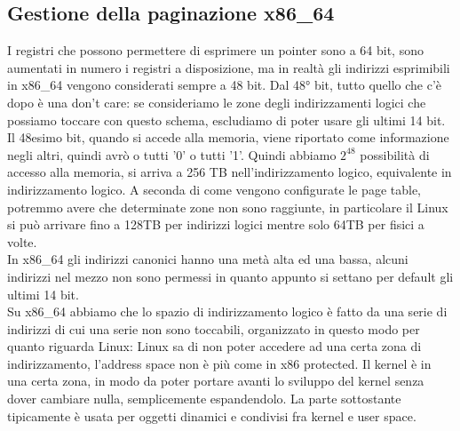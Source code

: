 \documentclass[12pt, oneside]{extbook}
\begin{document}
\subsection{Gestione della paginazione x86\_64}
I registri che possono permettere di esprimere un pointer sono a 64 bit, sono aumentati in numero i registri a disposizione, ma in realtà gli indirizzi esprimibili in x86\_64 vengono considerati sempre a 48 bit. Dal 48° bit, tutto quello che c'è dopo è una don't care: se consideriamo le zone degli indirizzamenti logici che possiamo toccare con questo schema, escludiamo di poter usare gli ultimi 14 bit. Il 48esimo bit, quando si accede alla memoria, viene riportato come informazione negli altri, quindi avrò o tutti '0' o tutti '1'. Quindi abbiamo $2^{48}$ possibilità di accesso alla memoria, si arriva a 256 TB nell'indirizzamento logico, equivalente in indirizzamento logico. A seconda di come vengono configurate le page table, potremmo avere che determinate zone non sono raggiunte, in particolare il Linux si può arrivare fino a 128TB per indirizzi logici mentre solo 64TB per fisici a volte.\\ In x86\_64 gli indirizzi canonici hanno una metà alta ed una bassa, alcuni indirizzi nel mezzo non sono permessi in quanto appunto si settano per default gli ultimi 14 bit.\\ Su x86\_64 abbiamo che lo spazio di indirizzamento logico è fatto da una serie di indirizzi di cui una serie non sono toccabili, organizzato in questo modo per quanto riguarda Linux:
Linux sa di non poter accedere ad una certa zona di indirizzamento, l'address space non è più come in x86 protected. Il kernel è in una certa zona, in modo da poter portare avanti lo sviluppo del kernel senza dover cambiare nulla, semplicemente espandendolo. La parte sottostante tipicamente è usata per oggetti dinamici e condivisi fra kernel e user space.
\end{document}
